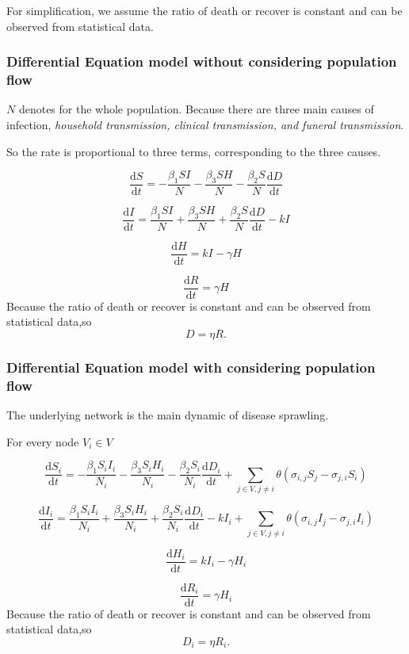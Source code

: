\documentclass[11pt]{article}
\begin{document}
For simplification, we assume the ratio of death or recover is constant and can be observed from statistical data.

\subsubsection{Differential Equation model without considering population flow}

$N$ denotes for the whole population. Because there are three main causes of infection, \emph{household transmission, clinical transmission, and funeral transmission}.

So the rate is proportional to three terms, corresponding to the three causes.

$$\frac{\mathrm{d}S}{\mathrm{d}t} = -\frac{\beta_1 S I}{N}-\frac{\beta_3 S H}{N}  - \frac{\beta_2 S }{N} \frac{\mathrm{d}D}{\mathrm{d}t} $$ 


$$\frac{\mathrm{d}I}{\mathrm{d}t} = \frac{\beta_1 S I}{N} +\frac{\beta_3 S H}{N}  + \frac{\beta_2 S }{N} \frac{\mathrm{d}D}{\mathrm{d}t} - kI$$ 

$$\frac{\mathrm{d}H}{\mathrm{d}t} = kI - \gamma H$$

$$\frac{\mathrm{d}R}{\mathrm{d}t} = \gamma H$$
Because the ratio of death or recover is constant and can be observed from statistical data,so 
$$D =\eta R. $$

\subsubsection{Differential Equation model with considering population flow}

The underlying network is the main dynamic of disease sprawling. 

For every node $V_i \in V$

$$\frac{\mathrm{d}S_i}{\mathrm{d}t} = -\frac{\beta_1 S_i I_i}{N_i}-\frac{\beta_3 S_i H_i}{N_i}  - \frac{\beta_2 S_i }{N_i} \frac{\mathrm{d}D_i}{\mathrm{d}t} + \sum_{j\in V,j\neq i} \theta(\sigma_{i,j} S_j - \sigma_{j,i} S_i) $$ 


$$\frac{\mathrm{d}I_i}{\mathrm{d}t} = \frac{\beta_1 S_i I_i}{N_i} +\frac{\beta_3 S_i H_i}{N_i}  + \frac{\beta_2 S_i }{N_i} \frac{\mathrm{d}D_i}{\mathrm{d}t} - kI_i + \sum_{j\in V,j\neq i} \theta(\sigma_{i,j} I_j - \sigma_{j,i} I_i)$$ 

$$\frac{\mathrm{d}H_i}{\mathrm{d}t} = kI_i - \gamma H_i$$

$$\frac{\mathrm{d}R_i}{\mathrm{d}t} = \gamma H_i$$
Because the ratio of death or recover is constant and can be observed from statistical data,so 
$$D_i =\eta R_i. $$
\end{document}
